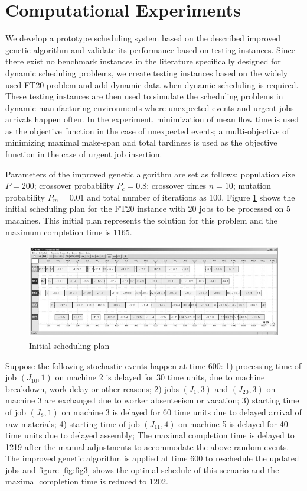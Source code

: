 \section{Computational Experiments}
We develop a prototype scheduling system based on the described improved genetic algorithm and validate its performance based on testing instances.
Since there exist no benchmark instances in the literature specifically designed for dynamic scheduling problems, we create testing instances based on the widely used FT20 problem and add dynamic data when dynamic scheduling is required.
These testing instances are then used to simulate the scheduling problems in dynamic manufacturing environments where unexpected events and urgent jobs arrivals happen often.
In the experiment, minimization of mean flow time is used as the objective function in the case of unexpected events; a multi-objective of minimizing maximal make-span and total tardiness is used as the objective function in the case of urgent job insertion.

Parameters of the improved genetic algorithm are set as follows: population size $P = 200$; crossover probability $P_c = 0.8$; crossover times $n = 10$; mutation probability $P_m = 0.01$ and total number of iterations as 100.
Figure \ref{fig:fig2} shows the initial scheduling plan for the FT20 instance with 20 jobs to be processed on 5 machines.
This initial plan represents the solution for this problem and the maximum completion time is 1165.

\begin{figure}[h!]
	\begin{center}
		\includegraphics[width=1\linewidth]{sections/figure2.jpg}
		\caption{Initial scheduling plan}
		\label{fig:fig2}
	\end{center}
\end{figure}


Suppose the following stochastic events happen at time 600: 1) processing time of job $(J_{10}, 1)$ on machine 2 is delayed for 30 time units, due to machine breakdown, work delay or other reasons; 2) jobs $(J_1, 3)$ and $(J_{20}, 3)$ on machine 3 are exchanged due to worker absenteeism or vacation; 3) starting time of job $(J_8, 1)$ on machine 3 is delayed for 60 time units due to delayed arrival of raw materials; 4) starting time of job $(J_{11}, 4)$ on machine 5 is delayed for 40 time units due to delayed assembly;
The maximal completion time is delayed to 1219 after the manual adjustments to accommodate the above random events.
The improved genetic algorithm is applied at time 600 to reschedule the updated jobs and figure \ref{fig:fig3} shows the optimal schedule of this scenario and the maximal completion time is reduced to 1202.


